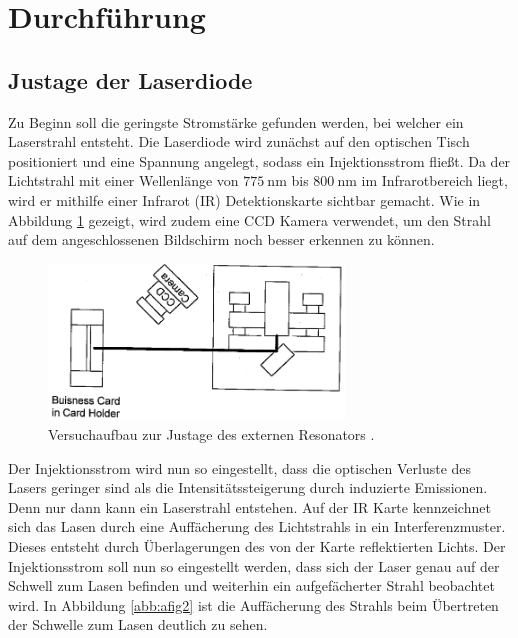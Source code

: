 \section{Durchführung}
\label{sec:Durchführung}

\subsection{Justage der Laserdiode}
Zu Beginn soll die geringste Stromstärke gefunden werden, bei welcher ein Laserstrahl entsteht.
Die Laserdiode wird zunächst auf den optischen Tisch positioniert und eine Spannung angelegt, sodass ein Injektionsstrom fließt.
Da der Lichtstrahl mit einer Wellenlänge von $\SI{775}{\nm}$ bis $\SI{800}{\nm}$ \cite{sanyo} im Infrarotbereich liegt, wird er mithilfe einer Infrarot (IR) Detektionskarte sichtbar gemacht.
Wie in Abbildung \ref{abb:afig1} gezeigt, wird zudem eine CCD Kamera verwendet, um den Strahl auf dem angeschlossenen Bildschirm noch besser erkennen zu können.

\begin{figure}
    \centering
    \includegraphics[width=0.7\textwidth]{pics/aufbau1}
    \caption{Versuchaufbau zur Justage des externen Resonators \cite{anleitung}. }
    \label{abb:afig1}
\end{figure}

Der Injektionsstrom wird nun so eingestellt, dass die optischen Verluste des Lasers geringer sind als die Intensitätssteigerung durch induzierte Emissionen.
Denn nur dann kann ein Laserstrahl entstehen.
Auf der IR Karte kennzeichnet sich das Lasen durch eine Auffächerung des Lichtstrahls in ein Interferenzmuster.
Dieses entsteht durch Überlagerungen des von der Karte reflektierten Lichts.
Der Injektionsstrom soll nun so eingestellt werden, dass sich der Laser genau auf der Schwell zum Lasen befinden und weiterhin ein aufgefächerter Strahl beobachtet wird.
In Abbildung \ref{abb:afig2} ist die Auffächerung des Strahls beim Übertreten der Schwelle zum Lasen deutlich zu sehen.

